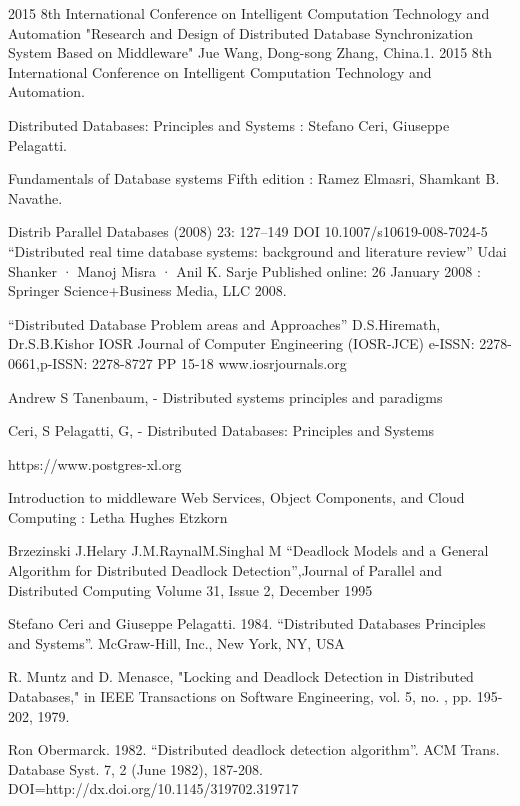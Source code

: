 \documentclass{article}[12pt,a4paper]
\begin{document}
\newpage
\begin{thebibliography}{1}
    
 2015 8th International Conference on Intelligent Computation Technology and Automation "Research and Design of Distributed Database Synchronization System Based on Middleware" Jue Wang, Dong-song Zhang, China.1. 2015 8th International Conference on Intelligent Computation Technology and Automation.

 Distributed Databases: Principles and Systems : Stefano Ceri, Giuseppe Pelagatti.

 Fundamentals of Database systems Fifth edition : Ramez Elmasri, Shamkant B. Navathe.

 Distrib Parallel Databases (2008) 23: 127–149 DOI 10.1007/s10619-008-7024-5 “Distributed real time database systems: background and literature review” Udai Shanker · Manoj Misra · Anil K. Sarje Published online: 26 January 2008 : Springer Science+Business Media, LLC 2008.

 “Distributed Database Problem areas and Approaches” D.S.Hiremath, Dr.S.B.Kishor IOSR Journal of Computer Engineering (IOSR-JCE) e-ISSN: 2278-0661,p-ISSN: 2278-8727 PP 15-18 www.iosrjournals.org

 Andrew S Tanenbaum, - Distributed systems principles and paradigms

 Ceri, S Pelagatti, G, - Distributed Databases: Principles and Systems

 https://www.postgres-xl.org

 Introduction to middleware Web Services, Object Components, and Cloud Computing : Letha Hughes Etzkorn

 Brzezinski J.Helary J.M.RaynalM.Singhal M “Deadlock Models and a General Algorithm for Distributed Deadlock Detection”,Journal of Parallel and Distributed Computing Volume 31, Issue 2, December 1995

 Stefano Ceri and Giuseppe Pelagatti. 1984. “Distributed Databases Principles and Systems”. McGraw-Hill, Inc., New York, NY, USA

 R. Muntz and D. Menasce, "Locking and Deadlock Detection in Distributed Databases," in IEEE Transactions on Software Engineering, vol. 5, no. , pp. 195-202, 1979. 

 Ron Obermarck. 1982. “Distributed deadlock detection algorithm”. ACM Trans. Database Syst. 7, 2 (June 1982), 187-208. DOI=http://dx.doi.org/10.1145/319702.319717 


\end{thebibliography}
\end{document}
